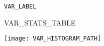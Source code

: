 {\huge \noindent\verb|VAR_LABEL|\\}

\vspace*{0.01\textwidth}

\noindent%
\begin{minipage}{0.25\textwidth}
\centering
\large
VAR_STATS_TABLE
\end{minipage}%
%
\begin{minipage}{0.75\textwidth}
\centering
\texttt{[image: VAR\_HISTOGRAM\_PATH]}
\end{minipage}

\clearpage

